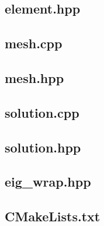 \documentclass[a4paper, 12pt]{article}
\begin{document}
\subsection{element.hpp} \label{subsec:element.hpp}


\subsection{mesh.cpp} \label{subsec:mesh.cpp}

\subsection{mesh.hpp} \label{subsec:mesh.hpp}


\subsection{solution.cpp} \label{subsec:solution.cpp}

\subsection{solution.hpp} \label{subsec:solution.hpp}


\subsection{eig\_wrap.hpp} \label{subsec:eig_wrap.hpp}


\subsection{CMakeLists.txt} \label{subsec:CMakeLists.txt}

\end{document}
